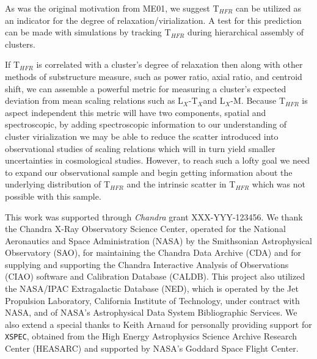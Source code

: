 \documentclass{emulateapj}
\newcommand{\tf}{T$_{HFR}$ }
\newcommand{\tx}{T$_{X}$}
\begin{document}
As was the original motivation from ME01, we suggest \tf can be
utilized as an indicator for the degree of relaxation/virialization. A
test for this prediction can be made with simulations by tracking \tf
during hierarchical assembly of clusters.

If \tf is correlated with a cluster's degree of relaxation then along
with other methods of substructure measure, such as power ratio, axial
ratio, and centroid shift, we can assemble a powerful metric for
measuring a cluster's expected deviation from mean scaling relations
such as L$_X$-\tx and L$_X$-M. Because \tf is aspect independent
this metric will have two components, spatial and spectroscopic,
by adding spectroscopic information to our understanding of cluster
virialization we may be able to reduce the scatter introduced into
observational studies of scaling relations which will in turn yield
smaller uncertainties in cosmological studies. However, to reach such
a lofty goal we need to expand our observational sample and begin
getting information about the underlying distribution of \tf and the
intrinsic scatter in \tf which was not possible with this sample.


\acknowledgements
This work was supported through {\textit{Chandra}} grant
XXX-YYY-123456. We thank the Chandra X-Ray Observatory Science Center,
operated for the National Aeronautics and Space Administration (NASA)
by the Smithsonian Astrophysical Observatory (SAO), for maintaining
the Chandra Data Archive (CDA) and for supplying and supporting the
Chandra Interactive Analysis of Observations (CIAO) software and
Calibration Database (CALDB). This project also utilized the NASA/IPAC
Extragalactic Database (NED), which is operated by the Jet Propulsion
Laboratory, California Institute of Technology, under contract with
NASA, and of NASA's Astrophysical Data System Bibliographic
Services. We also extend a special thanks to Keith Arnaud for
personally providing support for {\tt XSPEC}, obtained from the High
Energy Astrophysics Science Archive Research Center (HEASARC) and
supported by NASA's Goddard Space Flight Center.






\end{document}
